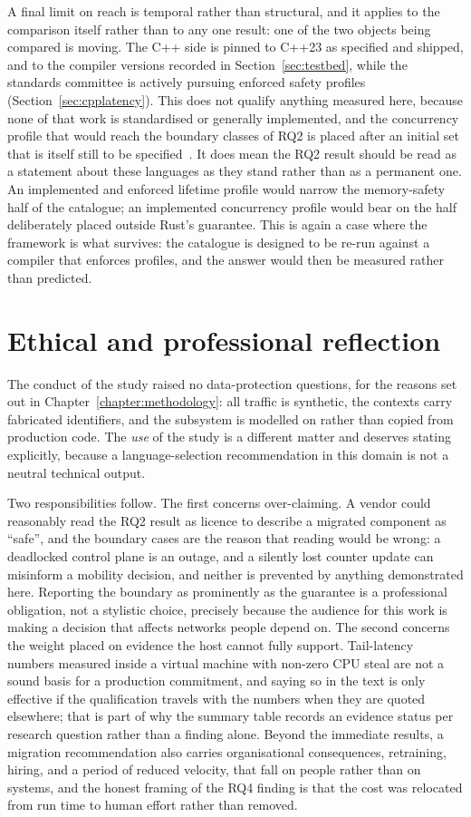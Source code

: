 \documentclass[english,twoside,openright,a4paper,censored,csm,software-track-2020]{HYthesisML}
\begin{document}
A final limit on reach is temporal rather than structural, and it applies to the comparison
itself rather than to any one result: one of the two objects being compared is moving. The C++
side is pinned to C++23 as specified and shipped, and to the compiler versions recorded in
Section~\ref{sec:testbed}, while the standards committee is actively pursuing enforced safety
profiles (Section~\ref{sec:cpplatency}). This does not qualify anything measured here, because
none of that work is standardised or generally implemented, and the concurrency profile that
would reach the boundary classes of RQ2 is placed after an initial set that is itself still to be
specified~\cite{vandevoorde2026profiles}. It does mean the RQ2 result should be read as a
statement about these languages as they stand rather than as a permanent one. An implemented and
enforced lifetime profile would narrow the memory-safety half of the catalogue; an implemented
concurrency profile would bear on the half deliberately placed outside Rust's guarantee. This is
again a case where the framework is what survives: the catalogue is designed to be re-run against
a compiler that enforces profiles, and the answer would then be measured rather than predicted.

\section{Ethical and professional reflection}
The conduct of the study raised no data-protection questions, for the reasons set out in
Chapter~\ref{chapter:methodology}: all traffic is synthetic, the contexts carry fabricated
identifiers, and the subsystem is modelled on rather than copied from production code. The
\emph{use} of the study is a different matter and deserves stating explicitly, because a
language-selection recommendation in this domain is not a neutral technical output.

Two responsibilities follow. The first concerns over-claiming. A vendor could reasonably read
the RQ2 result as licence to describe a migrated component as ``safe'', and the boundary cases
are the reason that reading would be wrong: a deadlocked control plane is an outage, and a
silently lost counter update can misinform a mobility decision, and neither is prevented by
anything demonstrated here. Reporting the boundary as prominently as the guarantee is a
professional obligation, not a stylistic choice, precisely because the audience for this work
is making a decision that affects networks people depend on. The second concerns the weight
placed on evidence the host cannot fully support. Tail-latency numbers measured inside a virtual
machine with non-zero CPU steal are not a sound basis for a production commitment, and saying so
in the text is only effective if the qualification travels with the numbers when they are quoted
elsewhere; that is part
of why the summary table records an evidence status per research question rather than a
finding alone. Beyond the immediate results, a migration recommendation also carries
organisational consequences, retraining, hiring, and a period of reduced velocity, that fall
on people rather than on systems, and the honest framing of the RQ4 finding is that the cost
was relocated from run time to human effort rather than removed.
\end{document}
